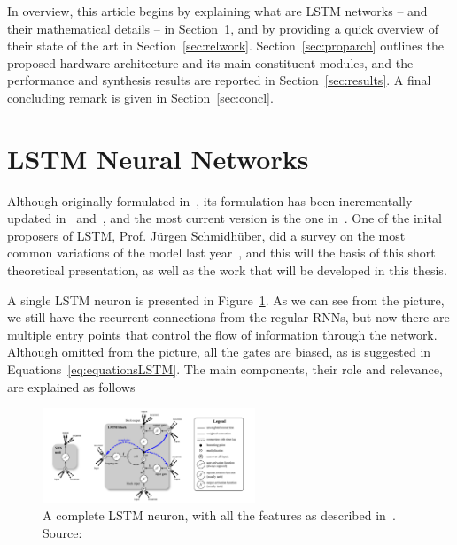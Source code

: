 \documentclass{IEEEtran}
\begin{document}
In overview, this article begins by explaining what are LSTM networks -- and their mathematical details -- in Section~\ref{sec:lstmnn}, and by providing a quick overview of their state of the art in Section~\ref{sec:relwork}.
Section~\ref{sec:proparch} outlines the proposed hardware architecture and its main constituent modules, and the performance and synthesis results are reported in Section~\ref{sec:results}. A final concluding remark is given in Section~\ref{sec:concl}.

\section{LSTM Neural Networks}\label{sec:lstmnn}
Although originally formulated in~\cite{Hoch97}, its formulation has been incrementally updated in~\cite{Gers00} and~\cite{Gers2000}, and the most current version is the one in~\cite{Graves05}. One of the inital proposers of LSTM, Prof. Jürgen Schmidhüber, did a survey on the most common variations of the model last year~\cite{Greff15}, and this will the basis of this short theoretical presentation, as well as the work that will be developed in this thesis. 

A single LSTM neuron is presented in Figure~\ref{fig:lstmneuron}. As we can see from the picture, we still have the recurrent connections from the regular RNNs, but now there are multiple entry points that control the flow of information through the network. Although omitted from the picture, all the gates are biased, as is suggested in Equations~\ref{eq:equationsLSTM}. The main components, their role and relevance, are explained as follows

\begin{figure}[!t]
	\centering
	\includegraphics[width=2.5in]{figures/lstmneuron.png}
    \caption{A complete LSTM neuron, with all the features as described in~\cite{Graves05}. Source:~\cite{Greff15}}
	\label{fig:lstmneuron}
\end{figure}
\end{document}
